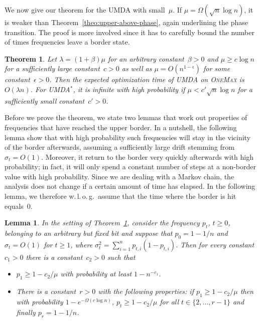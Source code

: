 \documentclass[11pt, a4paper]{article}
\newtheorem{theorem}{Theorem}
\newtheorem{lemma}{Lemma}
\newcommand*{\om}{\textsc{OneMax}\xspace}
\newcommand*{\OneMax}{\om}
\newcommand{\umdastar}{UMDA$^*$\xspace}
\newcommand{\umda}{UMDA\xspace}
\newcommand{\wlo}{w.\,l.\,o.\,g.\xspace}
\begin{document}
We now give our theorem for the \umda with small~$\mu$. If $\mu=\Omega(\sqrt{n}\log n)$, it is weaker 
than Theorem~\ref{theo:upper-above-phase}, again underlining the phase transition. The proof
is more involved since it  has to carefully  bound the number of times frequencies 
leave a border state.


 
\begin{theorem}
\label{theo:upper-below-phase}
Let %
$\lambda=(1+\beta)\mu$ for an arbitrary constant~$\beta>0$ and $\mu\ge c\log n$ 
for a sufficiently large constant~$c>0$
 as well as $\mu = O(n^{1-\epsilon})$ for some constant~$\epsilon>0$.
 Then the 
expected optimization time of \umda on \OneMax is $O(\lambda n)$.  
For \umdastar, it is infinite with high probability 
if $\mu<c'\sqrt{n}\log n$ for a sufficiently small constant~$c'>0$.
\end{theorem}

Before we prove the theorem, we state two lemmas that 
work out properties of frequencies that have reached the upper border. In a nutshell, 
the following lemma show that with high probability such frequencies will  
stay in the vicinity of the border afterwards, assuming 
a sufficiently large drift stemming from $\sigma_t=O(1)$. Moreover, it return to the 
border very quickly afterwards with high probability; in fact, it will only spend a constant number of  
steps at a non-border value with high probability.   
Since we are dealing with a Markov chain, 
 the analysis does not change if a certain amount of time has elapsed. In the following lemma, 
we therefore \wlo\ assume that the  time where the border is hit equals~$0$.
%

\begin{lemma}
\label{lem:upper-below-phase-above-half}
In the setting of Theorem~\ref{theo:upper-below-phase}, 
consider the frequency $p_t$, $t\ge 0$, belonging to an arbitrary but 
fixed bit and suppose that $p_0=1-1/n$ and $\sigma_t=O(1)$ for 
$t\ge 1$, where $\sigma_t^2=\sum_{i=1}^n p_{t,i}(1-p_{t,i})$.
Then for every constant $c_1>0$ there is a constant~$c_2>0$ such that 
\begin{itemize}
\item $p_1\ge 1-c_2/\mu$ with probability at least $1-n^{-c_1}$.  
\item There is a constant~$r>0$ with the following properties: if $p_1\ge 1-c_2/\mu$ then  
with probability $1-e^{-\Omega(c\log n)}$, $p_t\ge 1-c_2/\mu$ 
for all $t\in\{2,\dots,r-1\}$ and finally $p_r=1-1/n$. 
\end{itemize}

%
\end{lemma}
\end{document}
